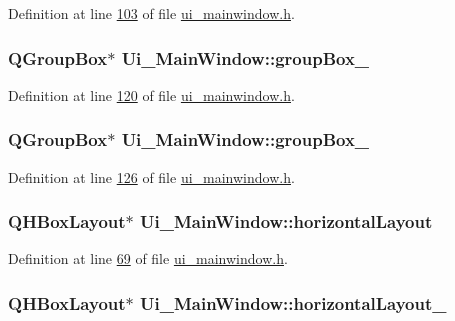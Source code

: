 Definition at line \hyperlink{a00139_source_l00103}{103} of file \hyperlink{a00139_source}{ui\+\_\+mainwindow.\+h}.

\hypertarget{a00080_a1a1fe5ec77ba52ba39a16db29ff0f91a}{
\subsubsection[{group\+Box\+\_\+8}]{\setlength{\rightskip}{0pt plus 5cm}Q\+Group\+Box$\ast$ Ui\+\_\+\+Main\+Window\+::group\+Box\+\_}}\label{a00080_a1a1fe5ec77ba52ba39a16db29ff0f91a}


Definition at line \hyperlink{a00139_source_l00120}{120} of file \hyperlink{a00139_source}{ui\+\_\+mainwindow.\+h}.

\hypertarget{a00080_ab492988d340548c7f30e098419ef10ee}{
\subsubsection[{group\+Box\+\_\+9}]{\setlength{\rightskip}{0pt plus 5cm}Q\+Group\+Box$\ast$ Ui\+\_\+\+Main\+Window\+::group\+Box\+\_}}\label{a00080_ab492988d340548c7f30e098419ef10ee}


Definition at line \hyperlink{a00139_source_l00126}{126} of file \hyperlink{a00139_source}{ui\+\_\+mainwindow.\+h}.

\hypertarget{a00080_acd6fdc9ebacc4b25b834162380d75ce8}{
\subsubsection[{horizontal\+Layout}]{\setlength{\rightskip}{0pt plus 5cm}Q\+H\+Box\+Layout$\ast$ Ui\+\_\+\+Main\+Window\+::horizontal\+Layout}}\label{a00080_acd6fdc9ebacc4b25b834162380d75ce8}


Definition at line \hyperlink{a00139_source_l00069}{69} of file \hyperlink{a00139_source}{ui\+\_\+mainwindow.\+h}.

\hypertarget{a00080_af1a7bbeee705545b94c55c297299118d}{
\subsubsection[{horizontal\+Layout\+\_\+10}]{\setlength{\rightskip}{0pt plus 5cm}Q\+H\+Box\+Layout$\ast$ Ui\+\_\+\+Main\+Window\+::horizontal\+Layout\+\_}}\label{a00080_af1a7bbeee705545b94c55c297299118d}


